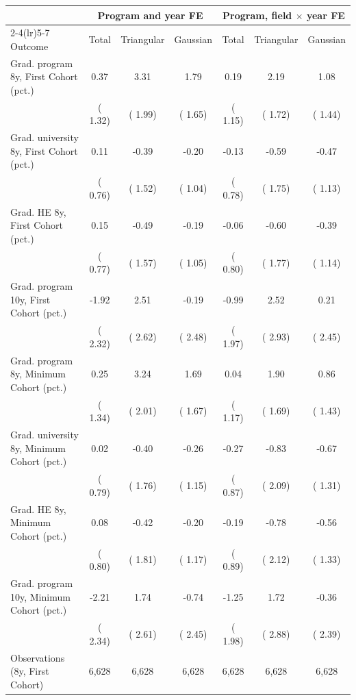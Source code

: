 \begin{tabular}{lcccccc}
\toprule
 & \multicolumn{3}{c}{Program and year FE} & \multicolumn{3}{c}{Program, field \(\times\) year FE} \\
\cmidrule(lr){2-4}\cmidrule(lr){5-7}
Outcome & Total & Triangular & Gaussian & Total & Triangular & Gaussian \\
\midrule
Grad. program 8y, First Cohort (pct.) &   0.37 &   3.31\sym{*} &   1.79 &   0.19 &   2.19 &   1.08 \\
 & ( 1.32) & ( 1.99) & ( 1.65) & ( 1.15) & ( 1.72) & ( 1.44) \\
Grad. university 8y, First Cohort (pct.) &   0.11 &  -0.39 &  -0.20 &  -0.13 &  -0.59 &  -0.47 \\
 & ( 0.76) & ( 1.52) & ( 1.04) & ( 0.78) & ( 1.75) & ( 1.13) \\
Grad. HE 8y, First Cohort (pct.) &   0.15 &  -0.49 &  -0.19 &  -0.06 &  -0.60 &  -0.39 \\
 & ( 0.77) & ( 1.57) & ( 1.05) & ( 0.80) & ( 1.77) & ( 1.14) \\
Grad. program 10y, First Cohort (pct.) &  -1.92 &   2.51 &  -0.19 &  -0.99 &   2.52 &   0.21 \\
 & ( 2.32) & ( 2.62) & ( 2.48) & ( 1.97) & ( 2.93) & ( 2.45) \\
\addlinespace
Grad. program 8y, Minimum Cohort (pct.) &   0.25 &   3.24 &   1.69 &   0.04 &   1.90 &   0.86 \\
 & ( 1.34) & ( 2.01) & ( 1.67) & ( 1.17) & ( 1.69) & ( 1.43) \\
Grad. university 8y, Minimum Cohort (pct.) &   0.02 &  -0.40 &  -0.26 &  -0.27 &  -0.83 &  -0.67 \\
 & ( 0.79) & ( 1.76) & ( 1.15) & ( 0.87) & ( 2.09) & ( 1.31) \\
Grad. HE 8y, Minimum Cohort (pct.) &   0.08 &  -0.42 &  -0.20 &  -0.19 &  -0.78 &  -0.56 \\
 & ( 0.80) & ( 1.81) & ( 1.17) & ( 0.89) & ( 2.12) & ( 1.33) \\
Grad. program 10y, Minimum Cohort (pct.) &  -2.21 &   1.74 &  -0.74 &  -1.25 &   1.72 &  -0.36 \\
 & ( 2.34) & ( 2.61) & ( 2.45) & ( 1.98) & ( 2.88) & ( 2.39) \\
\midrule
Observations (8y, First Cohort) &  6,628 &  6,628 &  6,628 &  6,628 &  6,628 &  6,628 \\
\bottomrule
\end{tabular}
